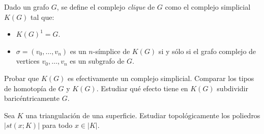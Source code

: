 \documentclass[twoside]{article}
\begin{document}
\newpage

\begin{ejercicio}{1.10}
Dado un grafo $G$, se define el complejo \emph{clique} de $G$ como el complejo simplicial $K(G)$ tal que:
\begin{itemize}
\item $K(G)^1 = G$.
\item $σ = (v_0,\dots,v_n)$ es un $n$-símplice de $K(G)$ si y sólo si el grafo complejo de vertices $v_0,\dots,v_n$ es un subgrafo de $G$.
\end{itemize}
Probar que $K(G)$ es efectivamente un complejo simplicial.
Comparar los tipos de homotopía de $G$ y $K(G)$.
Estudiar qué efecto tiene en $K(G)$ subdividir baricéntricamente $G$.
\end{ejercicio}
\begin{solucion}
\end{solucion}

\newpage

\begin{ejercicio}{1.11}
Sea $K$ una triangulación de una superficie.
Estudiar topológicamente los poliedros $|st(x;K)|$ para todo $x \in |K|$.
\end{ejercicio}
\begin{solucion}
\end{solucion}

\newpage
\end{document}
